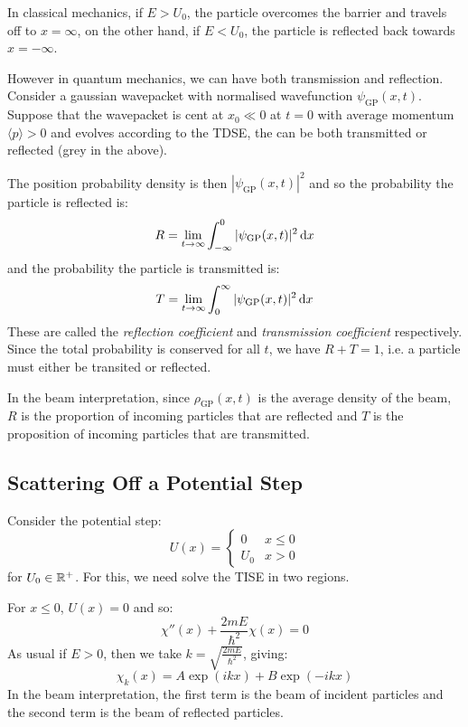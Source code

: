 \documentclass[../main.tex]{subfiles}
\begin{document}
In classical mechanics, if $E > U_0$, the particle overcomes the barrier and travels off to $x = \infty$, on the other hand, if $E < U_0$, the particle is reflected back towards $x = -\infty$.

However in quantum mechanics, we can have both transmission and reflection.
Consider a gaussian wavepacket with normalised wavefunction $\psi_{\text{GP}}(x, t)$.
Suppose that the wavepacket is cent at $x_0 \ll 0$ at $t = 0$ with average momentum $\langle p \rangle > 0$ and evolves according to the TDSE, the can be both transmitted or reflected (grey in the above).

The position probability density is then $|\psi_{\text{GP}}(x, t)|^2$ and so the probability the particle is reflected is:
\[
  R = \lim_{t \to \infty} \int_{-\infty}^{0} |\psi_{\text{GP}}(x, t)|^2  \d{x}
\]
and the probability the particle is transmitted is:
\[
  T = \lim_{t \to \infty} \int_{0}^{\infty} |\psi_{\text{GP}}(x, t)|^2  \d{x}
\]
These are called the \textit{reflection coefficient} and \textit{transmission coefficient} respectively.
Since the total probability is conserved for all $t$, we have $R + T = 1$, i.e. a particle must either be transited or reflected.

In the beam interpretation, since $\rho_{\text{GP}}(x, t)$ is the average density of the beam, $R$ is the proportion of incoming particles that are reflected and $T$ is the proposition of incoming particles that are transmitted.
\subsection{Scattering Off a Potential Step}
Consider the potential step:
\[
  U(x) = \begin{cases}
  0 & x \leq 0 \\
  U_0 & x > 0
  \end{cases}
\]
for $U_0 \in \mathbb{R}^{+}$.
For this, we need solve the TISE in two regions.

For $x \leq 0$, $U(x) = 0$ and so:
\[
  \chi''(x) + \frac{2mE}{\hbar^2} \chi(x) = 0
\]
As usual if $E > 0$, then we take $k = \sqrt{\frac{2mE}{\hbar^2}}$, giving:
\[
  \chi_k(x) = A \exp(ikx) + B \exp(-ikx)
\]
In the beam interpretation, the first term is the beam of incident particles and the second term is the beam of reflected particles.
\end{document}
